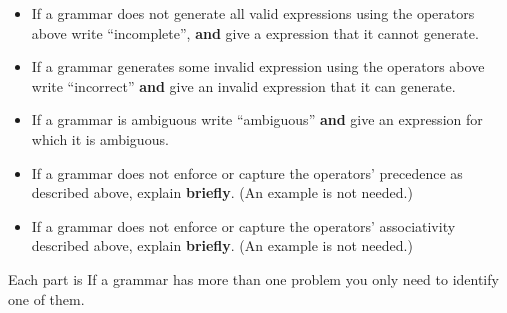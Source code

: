 \documentclass[11pt]{article}
\begin{document}
    \vspace{-2.75mm}

    \begin{itemize}

      \addtolength{\itemsep}{-1.75mm}

      \item If a grammar does not generate all valid expressions using the
            operators above write ``incomplete'', \textbf{and} give a
            expression that it cannot generate.

      \item If a grammar generates some invalid expression using the
            operators above write ``incorrect'' \textbf{and} give an invalid
            expression that it can generate.

      \item If a grammar is ambiguous write ``ambiguous'' \textbf{and} give
            an expression for which it is ambiguous.

      \item If a grammar does not enforce or capture the operators'
            precedence as described above, explain \textbf{briefly}.  (An
            example is not needed.)

      \item If a grammar does not enforce or capture the operators'
            associativity described above, explain \textbf{briefly}.  (An
            example is not needed.)

    \end{itemize}

    \vspace{-2.5mm}

    Each part is   If a grammar has more than one problem you only need
  to identify one of them.

    \enlargethispage{15mm}

    \vspace{-1mm}
\end{document}
